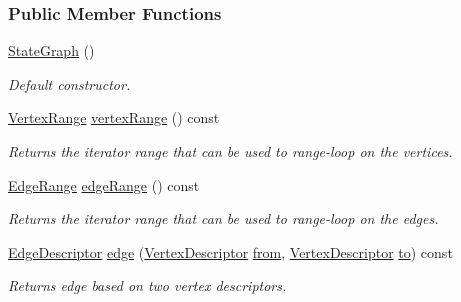 \subsubsection*{Public Member Functions}
\begin{DoxyCompactItemize}
\item 
\hyperlink{structslb_1_1core_1_1ui_1_1StateGraph_a929de7f53069b3a9e1a521448dea2ca8}{State\+Graph} ()\hypertarget{structslb_1_1core_1_1ui_1_1StateGraph_a929de7f53069b3a9e1a521448dea2ca8}{}\label{structslb_1_1core_1_1ui_1_1StateGraph_a929de7f53069b3a9e1a521448dea2ca8}

\begin{DoxyCompactList}\small\item\em Default constructor. \end{DoxyCompactList}\item 
\hyperlink{structslb_1_1core_1_1ui_1_1StateGraph_a586a27745242d8925a67f2f5ec6335f7}{Vertex\+Range} \hyperlink{structslb_1_1core_1_1ui_1_1StateGraph_a1ac081aed1b5782302cbcf5ce24c3648}{vertex\+Range} () const 
\begin{DoxyCompactList}\small\item\em Returns the iterator range that can be used to range-\/loop on the vertices. \end{DoxyCompactList}\item 
\hyperlink{structslb_1_1core_1_1ui_1_1StateGraph_a43d35f2a042bffa0d84013cee6af8dd1}{Edge\+Range} \hyperlink{structslb_1_1core_1_1ui_1_1StateGraph_acd12801c38cb03dca92fe67d4ae3188b}{edge\+Range} () const 
\begin{DoxyCompactList}\small\item\em Returns the iterator range that can be used to range-\/loop on the edges. \end{DoxyCompactList}\item 
\hyperlink{structslb_1_1core_1_1ui_1_1StateGraph_a7e894f002383b1687652a91549c3656d}{Edge\+Descriptor} \hyperlink{structslb_1_1core_1_1ui_1_1StateGraph_a36ee87cbf0db9e2389b85a3883eadf09}{edge} (\hyperlink{structslb_1_1core_1_1ui_1_1StateGraph_ab2d88fce7d30dc6346910900212a7e6d}{Vertex\+Descriptor} \hyperlink{structslb_1_1core_1_1ui_1_1StateGraph_ab706be51cb6a847bcc7ec3eacb569abb}{from}, \hyperlink{structslb_1_1core_1_1ui_1_1StateGraph_ab2d88fce7d30dc6346910900212a7e6d}{Vertex\+Descriptor} \hyperlink{structslb_1_1core_1_1ui_1_1StateGraph_a96f73bac974845d5b2d039e88b23289f}{to}) const 
\begin{DoxyCompactList}\small\item\em Returns edge based on two vertex descriptors. \end{DoxyCompactList}\item 

\end{DoxyCompactItemize}

